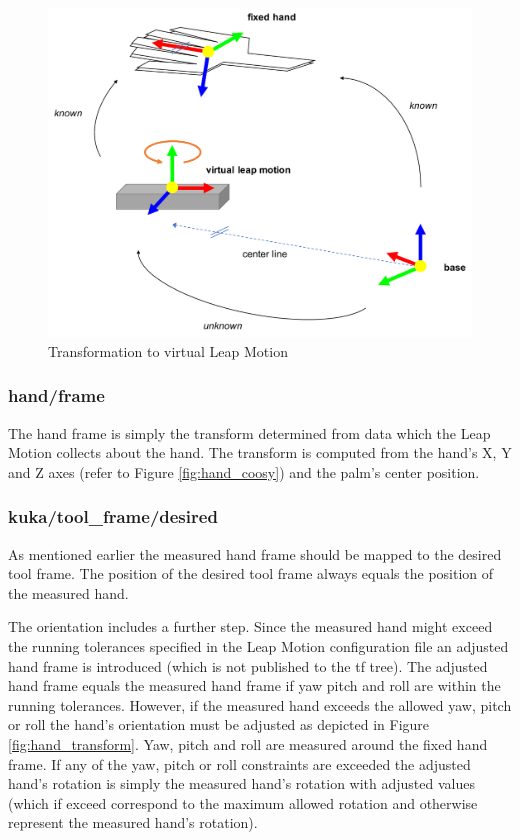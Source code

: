 \documentclass[headsepline,footinclude=false,fontsize=11pt,paper=a4,listof=totoc,bibliography=totoc,BCOR=12mm,DIV=14]{scrbook}
\begin{document}
\begin{figure}[h]
    \centering
    \includegraphics[width=14cm]{images/leap_transform}
    \caption{Transformation to virtual Leap Motion}
    \label{fig:leap_transform}
\end{figure}

\subsubsection{hand/frame}

The hand frame is simply the transform determined from data which the Leap Motion collects about the hand. The transform is computed from the hand's X, Y and Z axes (refer to Figure \ref{fig:hand_coosy}) and the palm's center position. 

\newpage
\subsubsection{kuka/tool\_frame/desired}

As mentioned earlier the measured hand frame should be mapped to the desired tool frame. The position of the desired tool frame always equals the position of the measured hand.

The orientation includes a further step. Since the measured hand might exceed the running tolerances specified in the Leap Motion configuration file an adjusted hand frame is introduced (which is not published to the tf tree). The adjusted hand frame equals the measured hand frame if yaw pitch and roll are within the running tolerances. However, if the measured hand exceeds the allowed yaw, pitch or roll the hand's orientation must be adjusted as depicted in Figure \ref{fig:hand_transform}. Yaw, pitch and roll are measured around the fixed hand frame. If any of the yaw, pitch or roll constraints are exceeded the adjusted hand's rotation is simply the measured hand's rotation with adjusted values (which if exceed correspond to the maximum allowed rotation and otherwise represent the measured hand's rotation). 
\end{document}
